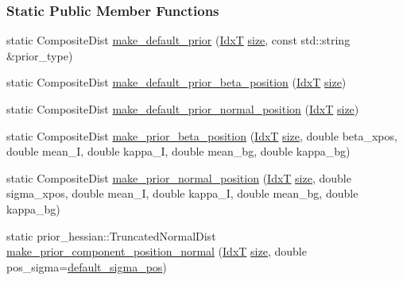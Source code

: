 \subsubsection*{Static Public Member Functions}
\begin{DoxyCompactItemize}
\item 
static Composite\+Dist \hyperlink{classmappel_1_1Gauss1DModel_ab9aeff0d5e4f065e81b1d49183ca3fcb}{make\+\_\+default\+\_\+prior} (\hyperlink{namespacemappel_ab17ec0f30b61ece292439d7ece81d3a8}{IdxT} \hyperlink{classmappel_1_1ImageFormat1DBase_a8941b4d028e4dd881146a7c1b9039bb1}{size}, const std\+::string \&prior\+\_\+type)
\item 
static Composite\+Dist \hyperlink{classmappel_1_1Gauss1DModel_a539665592706f1d18966ce7fff974f92}{make\+\_\+default\+\_\+prior\+\_\+beta\+\_\+position} (\hyperlink{namespacemappel_ab17ec0f30b61ece292439d7ece81d3a8}{IdxT} \hyperlink{classmappel_1_1ImageFormat1DBase_a8941b4d028e4dd881146a7c1b9039bb1}{size})
\item 
static Composite\+Dist \hyperlink{classmappel_1_1Gauss1DModel_a456b984f2309b0d5a72516361e4e18d0}{make\+\_\+default\+\_\+prior\+\_\+normal\+\_\+position} (\hyperlink{namespacemappel_ab17ec0f30b61ece292439d7ece81d3a8}{IdxT} \hyperlink{classmappel_1_1ImageFormat1DBase_a8941b4d028e4dd881146a7c1b9039bb1}{size})
\item 
static Composite\+Dist \hyperlink{classmappel_1_1Gauss1DModel_a808fde22a0fb00140b4ba60e7df685eb}{make\+\_\+prior\+\_\+beta\+\_\+position} (\hyperlink{namespacemappel_ab17ec0f30b61ece292439d7ece81d3a8}{IdxT} \hyperlink{classmappel_1_1ImageFormat1DBase_a8941b4d028e4dd881146a7c1b9039bb1}{size}, double beta\+\_\+xpos, double mean\+\_\+I, double kappa\+\_\+I, double mean\+\_\+bg, double kappa\+\_\+bg)
\item 
static Composite\+Dist \hyperlink{classmappel_1_1Gauss1DModel_ab4fc9aafd94b2dd6532ef71f2ea47619}{make\+\_\+prior\+\_\+normal\+\_\+position} (\hyperlink{namespacemappel_ab17ec0f30b61ece292439d7ece81d3a8}{IdxT} \hyperlink{classmappel_1_1ImageFormat1DBase_a8941b4d028e4dd881146a7c1b9039bb1}{size}, double sigma\+\_\+xpos, double mean\+\_\+I, double kappa\+\_\+I, double mean\+\_\+bg, double kappa\+\_\+bg)
\item 
static prior\+\_\+hessian\+::\+Truncated\+Normal\+Dist \hyperlink{classmappel_1_1PointEmitterModel_ab99350cf74097c558f7a93b79e7a44c3}{make\+\_\+prior\+\_\+component\+\_\+position\+\_\+normal} (\hyperlink{namespacemappel_ab17ec0f30b61ece292439d7ece81d3a8}{IdxT} \hyperlink{classmappel_1_1ImageFormat1DBase_a8941b4d028e4dd881146a7c1b9039bb1}{size}, double pos\+\_\+sigma=\hyperlink{classmappel_1_1PointEmitterModel_aa98a73b9e3937c00b07596d3928df3ca}{default\+\_\+sigma\+\_\+pos})

\end{DoxyCompactItemize}
